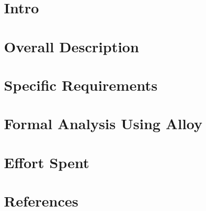 \documentclass{config/PoliMi3i_thesis}
\numberwithin{algorithm}{chapter}
\begin{document}
\renewcommand*\contentsname{Table Of Contents}
\tableofcontents

\pagebreak
\chapter{Intro}


\pagebreak
\chapter{Overall Description}


\pagebreak
\chapter{Specific Requirements}



\pagebreak
\chapter{Formal Analysis Using Alloy}


\pagebreak
\chapter{Effort Spent}


\pagebreak
\chapter{References}

\pagebreak
\listoffigures
\listoftables
\end{document}
